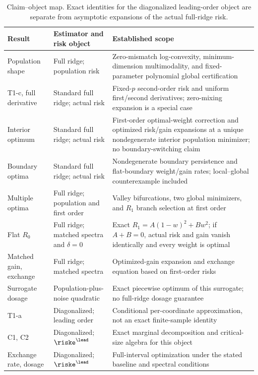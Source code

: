 \begin{table}[h]
  \centering
  \small
  \caption{Claim--object map. Exact identities for the diagonalized leading-order object are separate from asymptotic expansions of the actual full-ridge risk.}
  \label{supp:tab:claimobjects}
  \begin{tabular}{@{}p{.17\linewidth}p{.29\linewidth}p{.42\linewidth}@{}}
    \toprule
    Result & Estimator and risk object & Established scope \\
    \midrule
    Population shape & Full ridge; population risk & Zero-mismatch log-convexity, minimum-dimension multimodality, and fixed-parameter polynomial global certification \\
    T1-c, full derivative & Standard full ridge; actual risk & Fixed-$p$ second-order risk and uniform first/second derivatives; zero-mixing expansion is a special case \\
    Interior optimum & Standard full ridge; actual risk & First-order optimal-weight correction and optimized risk/gain expansions at a unique nondegenerate interior population minimizer; no boundary-switching claim \\
    Boundary optima & Standard full ridge; actual risk & Nondegenerate boundary persistence and flat-boundary weight/gain rates; local--global counterexample included \\
    Multiple optima & Full ridge; population and first order & Valley bifurcations, two global minimizers, and $R_1$ branch selection at first order \\
    Flat $R_0$ & Full ridge; matched spectra and $\delta=0$ & Exact $R_1=A(1-w)^2+Bw^2$; if $A+B=0$, actual risk and gain vanish identically and every weight is optimal \\
    Matched gain, exchange & Full ridge; matched spectra & Optimized-gain expansion and exchange equation based on first-order risks \\
    Surrogate dosage & Population-plus-noise quadratic & Exact piecewise optimum of this surrogate; no full-ridge dosage guarantee \\
    T1-a & Diagonalized; leading order & Conditional per-coordinate approximation, not an exact finite-sample identity \\
    C1, C2 & Diagonalized; $\riske^{\lead}$ & Exact marginal decomposition and critical-size algebra for this object \\
    Exchange rate, dosage & Diagonalized; $\riske^{\lead}$ & Full-interval optimization under the stated baseline and spectral conditions \\
    \bottomrule
  \end{tabular}
\end{table}

